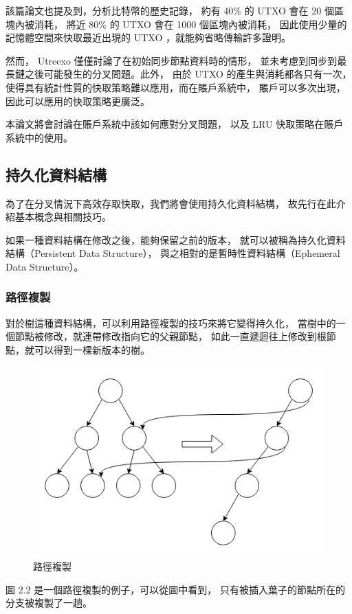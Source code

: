 該篇論文也提及到，分析比特幣的歷史記錄，
約有 40\% 的 UTXO 會在 20 個區塊內被消耗，
將近 80\% 的 UTXO 會在 1000 個區塊內被消耗，
因此使用少量的記憶體空間來快取最近出現的 UTXO ，就能夠省略傳輸許多證明。

然而， Utreexo 僅僅討論了在初始同步節點資料時的情形，
並未考慮到同步到最長鏈之後可能發生的分叉問題。此外，
由於 UTXO 的產生與消耗都各只有一次，
使得具有統計性質的快取策略難以應用，而在賬戶系統中，
賬戶可以多次出現，因此可以應用的快取策略更廣泛。

本論文將會討論在賬戶系統中該如何應對分叉問題，
以及 LRU 快取策略在賬戶系統中的使用。

\subsection{持久化資料結構}

為了在分叉情況下高效存取快取，我們將會使用持久化資料結構，
故先行在此介紹基本概念與相關技巧。

如果一種資料結構在修改之後，能夠保留之前的版本，
就可以被稱為持久化資料結構\cite{driscoll1986making}（Persistent Data Structure），
與之相對的是暫時性資料結構（Ephemeral Data Structure）。

\subsubsection{路徑複製}
對於樹這種資料結構，可以利用路徑複製的技巧來將它變得持久化，
當樹中的一個節點被修改，就連帶修改指向它的父親節點，
如此一直遞迴往上修改到根節點，就可以得到一棵新版本的樹。

\begin{figure}
\includegraphics[width=\textwidth]{../images/路徑複製.png}
\caption{路徑複製}
\end{figure}

圖 2.2 是一個路徑複製的例子，可以從圖中看到，
只有被插入葉子的節點所在的分支被複製了一趟。
